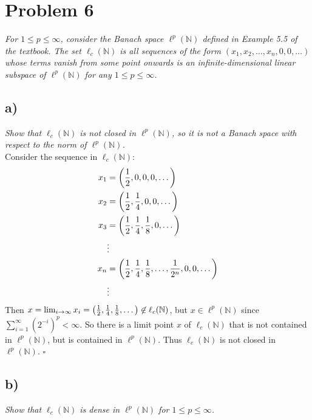 \documentclass[12pt]{article}
\theoremstyle{plain}
\begin{document}
\section*{Problem 6}
\emph{For $1\leq p \leq \infty$, consider the Banach space $\ell^p(\mathbb{N})$ defined in Example 5.5 of the textbook.  The set $\ell_c(\mathbb{N})$ is all sequences of the form $(x_1, x_2, \dots, x_n, 0, 0, \dots)$ whose terms vanish from some point onwards is an infinite-dimensional linear subspace of $\ell^p(\mathbb{N})$ for any $1 \leq p \leq \infty$.}

\subsection*{ a)}
\emph{Show that $\ell_c(\mathbb{N})$ is not closed in $\ell^p(\mathbb{N})$, so it is not a Banach space with respect to the norm of $\ell^p(\mathbb{N})$.} \\

Consider the sequence in $\ell_c(\mathbb{N})$:
\begin{align*}
    x_1 &= \qty(\frac{1}{2}, 0, 0, 0, \dots) \\
    x_2 &= \qty(\frac{1}{2}, \frac{1}{4}, 0, 0, \dots) \\
    x_3 &= \qty(\frac{1}{2}, \frac{1}{4}, \frac{1}{8}, 0, \dots) \\
    &\vdots \\
    x_n &= \qty(\frac{1}{2}, \frac{1}{4}, \frac{1}{8}, \dots, \frac{1}{2^n}, 0, 0, \dots) \\
    &\vdots
\end{align*}
Then $x = \lim_{i\rightarrow\infty}x_i = \qty(\frac{1}{2}, \frac{1}{4}, \frac{1}{8}, \dots) \not\in \ell_c(\mathbb{N})$, but $x \in \ell^p(\mathbb{N})$ since $\sum_{i=1}^\infty (2^{-i})^p < \infty$.  So there is a limit point $x$ of $\ell_c(\mathbb{N})$ that is not contained in $\ell^p(\mathbb{N})$, but is contained in $\ell^p(\mathbb{N})$.  Thus $\ell_c(\mathbb{N})$ is not closed in $\ell^p(\mathbb{N})$. \hfill $\square$

\subsection*{ b)}
\emph{Show that $\ell_c(\mathbb{N})$ is dense in $\ell^p(\mathbb{N})$ for $1 \leq p \leq \infty$.} \\
\end{document}
